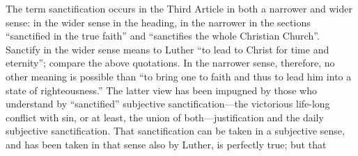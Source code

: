 The term sanctification occurs in the Third Article in both a narrower and wider sense: in the wider sense in the heading, in the narrower in the sections “sanctified in the true faith” and “sanctifies the whole Christian Church”. Sanctify in the wider sense means to Luther “to lead to Christ for time and eternity”; compare the above quotations. In the narrower sense, therefore, no other meaning is possible than “to bring one to faith and thus to lead him into a state of righteousness.” The latter view has been impugned by those who understand by “sanctified” subjective sanctification—the victorious life-long conflict with sin, or at least, the union of both—justification and the daily subjective sanctification. That sanctification can be taken in a subjective sense, and has been taken in that sense also by Luther, is perfectly true; but that
